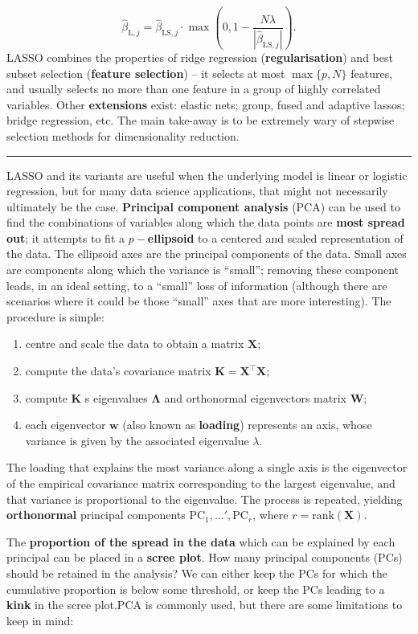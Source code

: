 $$\hat{\beta}_{\textrm{L},j}=\hat{\beta}_{\textrm{LS},j}\cdot \max \left(0,1-\frac{N\lambda}{|\hat{\beta}_{\textrm{LS},j}|}\right).$$
LASSO combines the properties of   ridge regression (\textbf{regularisation}) and best subset selection (\textbf{feature selection}) -- it selects at most $\max\{p,N\}$ features, and usually selects no more than one feature in a group of highly correlated variables. Other \textbf{extensions} exist: elastic nets; group, fused and adaptive lassos; bridge regression, etc.\newl
The main take-away is to be extremely wary of stepwise selection methods for dimensionality reduction.\begin{center}
    \rule{0.5\textwidth}{.4pt}
\end{center} LASSO and its variants are useful when the underlying model is linear or logistic regression, but for many data science applications, that might not necessarily ultimately be the case. \textbf{Principal component analysis} (PCA) can be used to find the combinations of variables along which the data points are \textbf{most spread out}; it attempts to fit a $p-$\textbf{ellipsoid} to a centered and scaled representation of the data. The ellipsoid axes are the principal components of the data. Small axes are components along which the variance is ``small''; removing these component leads, in an ideal setting, to a ``small'' loss of information (although there are scenarios where it could be those ``small'' axes that are more interesting). 
\newl The procedure is simple: 
\begin{enumerate}[noitemsep]
\item centre and scale the data to obtain a matrix $\mathbf{X}$;
\item compute the data's covariance matrix $\mathbf{K}=\mathbf{X}^{\!\top}\mathbf{X}$;
\item compute $\mathbf{K}$
s eigenvalues $\mathbf{\Lambda}$ and orthonormal eigenvectors matrix $\mathbf{W}$;
\item each eigenvector $\mathbf{w}$ (also known as \textbf{loading}) represents an axis, whose variance is given by the associated eigenvalue $\lambda$. \end{enumerate}
The loading that explains the most variance along a single axis is the eigenvector of the empirical covariance matrix corresponding to the largest eigenvalue, and that variance is proportional to the eigenvalue. The process is repeated, yielding \textbf{orthonormal} principal components $\textrm{PC}_1,\ldots',\textrm{PC}_r$, where $r=\textrm{rank}(\mathbf{X})$.\par The \textbf{proportion of the spread in the data} which can be explained by each principal can be placed in a \textbf{scree plot}. How many principal components (PCs) should be retained in the analysis? We can either keep the PCs for which the cumulative proportion is below some threshold, or keep  the PCs leading to a \textbf{kink} in the scree plot.\newl PCA is commonly used, but there are some limitations to keep in mind: 
